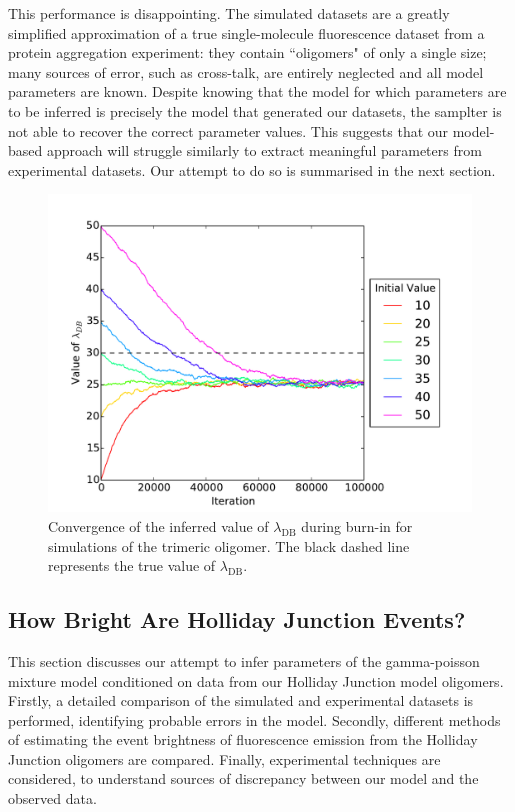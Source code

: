 This performance is disappointing. The simulated datasets are a greatly simplified approximation of a true single-molecule fluorescence dataset from a protein aggregation experiment: they contain ``oligomers" of only a single size; many sources of error, such as cross-talk, are entirely neglected and all model parameters are known. Despite knowing that the model for which parameters are to be inferred is precisely the model that generated our datasets, the samplter is not able to recover the correct parameter values. This suggests that our model-based approach will struggle similarly to extract meaningful parameters from experimental datasets. Our attempt to do so is summarised in the next section.

\begin{figure}
   \begin{center}
      \includegraphics*[clip=true, width=6in]{sizing/Convergence.pdf}
      \caption{Convergence of the inferred value of $\lambda_{\text{DB}}$ during burn-in for simulations of the trimeric oligomer. The black dashed line represents the true value of $\lambda_{\text{DB}}$.}
      \label{fig:convergence}
   \end{center}
\end{figure}

\subsection{How Bright Are Holliday Junction Events?}
This section discusses our attempt to infer parameters of the gamma-poisson mixture model conditioned on data from our Holliday Junction model oligomers. Firstly, a detailed comparison of the simulated and experimental datasets is performed, identifying probable errors in the model. Secondly, different methods of estimating the event brightness of fluorescence emission from the Holliday Junction oligomers are compared. Finally, experimental techniques are considered, to understand sources of discrepancy between our model and the observed data.

